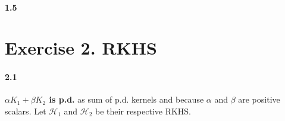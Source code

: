 \documentclass[10pt]{article}
\begin{document}
    \paragraph{1.5}

    \section*{Exercise 2. RKHS}
    \paragraph{2.1} \textbf{$\alpha K_1 + \beta K_2$ is p.d.} as sum of p.d. 
    kernels and because $\alpha$ and $\beta$ are positive scalars. Let 
    $\mathcal{H}_1$ and $\mathcal{H}_2$ be their respective RKHS.

    
\end{document}
